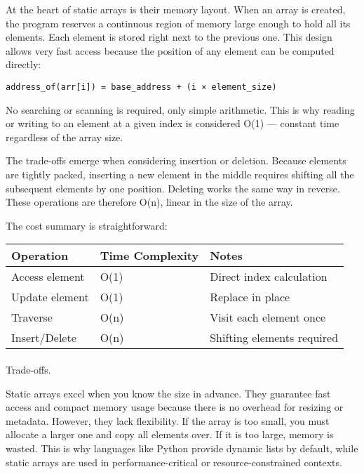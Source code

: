 \documentclass[
  letterpaper,
  DIV=11,
  numbers=noendperiod]{scrreprt}
\makeatletter
\let\oldparagraph\paragraph
\renewcommand{\paragraph}{
    \@ifstar
      \xxxParagraphStar
      \xxxParagraphNoStar
  }
\newcommand{\xxxParagraphStar}[1]{\oldparagraph*{#1}\mbox{}}
\newcommand{\xxxParagraphNoStar}[1]{\oldparagraph{#1}\mbox{}}
\makeatother
\begin{document}
At the heart of static arrays is their memory layout. When an array is
created, the program reserves a continuous region of memory large enough
to hold all its elements. Each element is stored right next to the
previous one. This design allows very fast access because the position
of any element can be computed directly:

\begin{verbatim}
address_of(arr[i]) = base_address + (i × element_size)
\end{verbatim}

No searching or scanning is required, only simple arithmetic. This is
why reading or writing to an element at a given index is considered O(1)
--- constant time regardless of the array size.

The trade-offs emerge when considering insertion or deletion. Because
elements are tightly packed, inserting a new element in the middle
requires shifting all the subsequent elements by one position. Deleting
works the same way in reverse. These operations are therefore O(n),
linear in the size of the array.

The cost summary is straightforward:

\begin{longtable}[]{@{}lll@{}}
\toprule\noalign{}
Operation & Time Complexity & Notes \\
\midrule\noalign{}
\endhead
\bottomrule\noalign{}
\endlastfoot
Access element & O(1) & Direct index calculation \\
Update element & O(1) & Replace in place \\
Traverse & O(n) & Visit each element once \\
Insert/Delete & O(n) & Shifting elements required \\
\end{longtable}

\paragraph{Trade-offs.}\label{trade-offs.}

Static arrays excel when you know the size in advance. They guarantee
fast access and compact memory usage because there is no overhead for
resizing or metadata. However, they lack flexibility. If the array is
too small, you must allocate a larger one and copy all elements over. If
it is too large, memory is wasted. This is why languages like Python
provide dynamic lists by default, while static arrays are used in
performance-critical or resource-constrained contexts.
\end{document}
